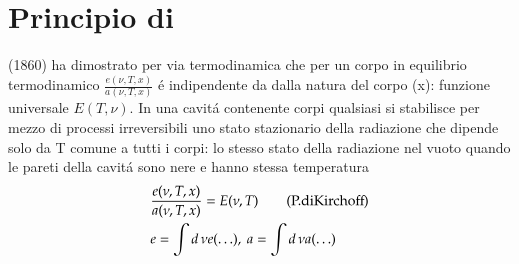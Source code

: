         \section{Principio di \khhff{}}
                \khhff{}(1860) ha dimostrato per via termodinamica che per un corpo in equilibrio termodinamico $\frac{e(\nu,T,x)}{a(\nu,T,x)}$ \'e indipendente da dalla natura del corpo (x): funzione universale $E(T,\nu)$. In una cavit\'a contenente corpi qualsiasi si stabilisce per mezzo di processi irreversibili uno stato stazionario della radiazione che dipende solo da T comune a tutti i corpi: lo stesso stato della radiazione nel vuoto quando le pareti della cavit\'a sono nere e hanno stessa temperatura
                \begin{align}
                    &\frac{e(\nu,T,x)}{a(\nu,T,x)}=E(\nu,T)\tag{P.di\khhff{}}\label{pkhhff}\\
                    &e=\int d\,\nu e(\ldots),\ a=\int d\,\nu a(\ldots)
                \end{align}
